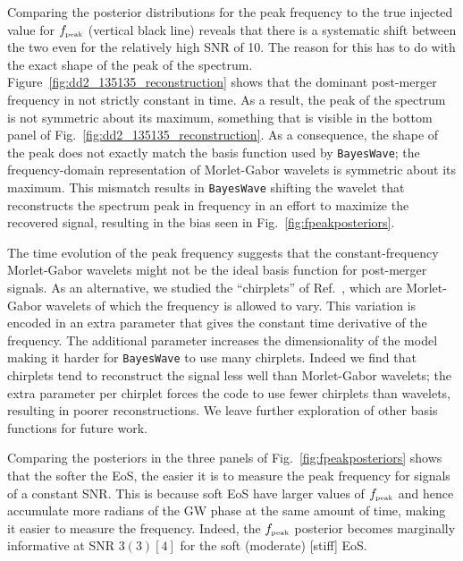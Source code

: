 \documentclass[aps,prd,amsmath,floats,floatfix, twocolumn,
superscriptaddress,nofootinbib,showpacs]{revtex4-1}
\newcommand{\peak}{{\mbox{\tiny peak}}}
\begin{document}
Comparing the posterior distributions for the peak frequency to the true injected value for $f_{\peak}$ (vertical black line) reveals that there is a systematic shift between the two even for the relatively high SNR of 10. The reason for this has to do with the exact shape of the peak of the spectrum. Figure~\ref{fig:dd2_135135_reconstruction} shows that the dominant post-merger frequency in not strictly constant in time. As a result, the peak of the spectrum is not symmetric about its maximum, something that is visible in the bottom panel of Fig.~\ref{fig:dd2_135135_reconstruction}. As a consequence, the shape of the peak does not exactly match the basis function used by {\tt BayesWave}; the frequency-domain representation of Morlet-Gabor wavelets is symmetric about its maximum. This mismatch results in {\tt BayesWave} shifting the wavelet that reconstructs the spectrum peak in frequency in an effort to maximize the recovered signal, resulting in the bias seen in Fig.~\ref{fig:fpeakposteriors}.

The time evolution of the peak frequency suggests that  the constant-frequency Morlet-Gabor wavelets might not be the ideal basis function for post-merger signals. As an alternative, we studied the ``chirplets'' of Ref.~\cite{chirplets}, which are Morlet-Gabor wavelets of which the frequency is allowed to vary. This variation is encoded in an extra parameter that gives the constant time derivative of the frequency. The additional parameter increases the dimensionality of the model making it harder for {\tt BayesWave} to use many chirplets. Indeed we find that chirplets tend to reconstruct the signal less well than Morlet-Gabor wavelets; the extra parameter per chirplet forces the code to use fewer chirplets than wavelets, resulting in poorer reconstructions. We leave further exploration of other basis functions for future work.

Comparing the posteriors in the three panels of Fig.~\ref{fig:fpeakposteriors} shows that the softer the EoS, the easier it is to measure the peak frequency for signals of a constant SNR. This is because soft EoS have larger values of $f_{\peak}$ and hence accumulate more radians of the GW phase at the same amount of time, making it easier to measure the frequency. Indeed, the $f_{\peak}$ posterior becomes marginally informative at SNR $3 (3) [4]$ for the soft (moderate) [stiff] EoS.
 
\end{document}
